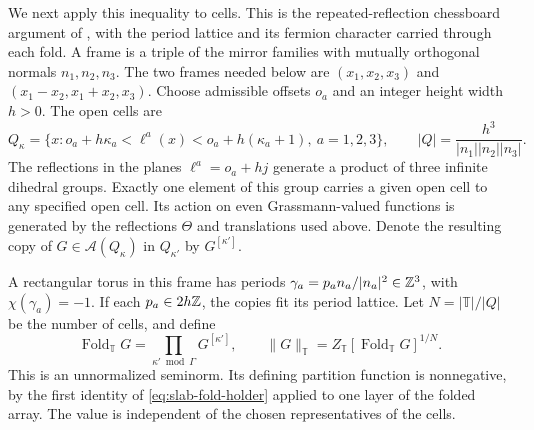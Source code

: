 We next apply this inequality to cells. This is the repeated-reflection
chessboard argument of \cite[Section~4]{FILS1978}, with the period
lattice and its fermion character carried through each fold. A frame is a triple of the
mirror families with mutually orthogonal normals $n_1,n_2,n_3$.
The two frames needed below are $(x_1,x_2,x_3)$ and
$(x_1-x_2,x_1+x_2,x_3)$. Choose admissible offsets $o_a$ and an integer
height width $h>0$. The open cells are
\begin{equation}\label{eq:slab-cells}
 Q_\kappa=\{x:o_a+h\kappa_a<\ell^a(x)
                         <o_a+h(\kappa_a+1),\ a=1,2,3\},
 \qquad |Q|=\frac{h^3}{|n_1||n_2||n_3|}.
\end{equation}
The reflections in the planes $\ell^a=o_a+hj$ generate a product of
three infinite dihedral groups. Exactly one element of this group
carries a given open cell to any specified open cell. Its action on
even Grassmann-valued functions is generated by the reflections
$\Theta$ and translations used above. Denote the resulting copy of
$G\in\mathcal A(Q_\kappa)$ in $Q_{\kappa'}$ by $G^{[\kappa']}$.

A rectangular torus in this frame has periods
$\gamma_a=p_an_a/|n_a|^2\in\mathbb Z^3$, with $\chi(\gamma_a)=-1$.
If each $p_a\in2h\mathbb Z$, the copies fit its period lattice. Let
$N=|\mathbb T|/|Q|$ be the number of cells, and define
\begin{equation}\label{eq:slab-chessboard-norm}
 \operatorname{Fold}_{\mathbb T}G
          =\prod_{\kappa'\bmod\Gamma}G^{[\kappa']},
 \qquad \|G\|_{\mathbb T}
          =Z_{\mathbb T}[\operatorname{Fold}_{\mathbb T}G]^{1/N}.
\end{equation}
This is an unnormalized seminorm. Its defining partition function is
nonnegative, by the first identity of
\eqref{eq:slab-fold-holder} applied to one layer of the folded array.
The value is independent of the chosen representatives of the cells.

